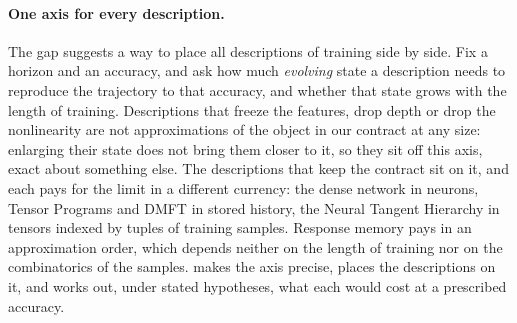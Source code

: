 \documentclass[11pt]{article}
\theoremstyle{definition}
\theoremstyle{remark}
\begin{document}
\paragraph{One axis for every description.}
The gap suggests a way to place all descriptions of training side by side.  Fix
a horizon and an accuracy, and ask how much \emph{evolving} state a description
needs to reproduce the trajectory to that accuracy, and whether that state grows
with the length of training.  Descriptions that freeze the features, drop depth
or drop the nonlinearity are not approximations of the object in our contract at
any size: enlarging their state does not bring them closer to it, so they sit
off this axis, exact about something else.  The descriptions that keep the
contract sit on it, and each pays for the limit in a different currency: the
dense network in neurons, Tensor Programs and DMFT in stored history, the Neural
Tangent Hierarchy in tensors indexed by tuples of training samples.  Response
memory pays in an approximation order, which depends neither on the length of
training nor on the combinatorics of the samples.   makes the
axis precise,  places the descriptions on it, and 
works out, under stated hypotheses, what each would cost at a prescribed
accuracy.
\end{document}
